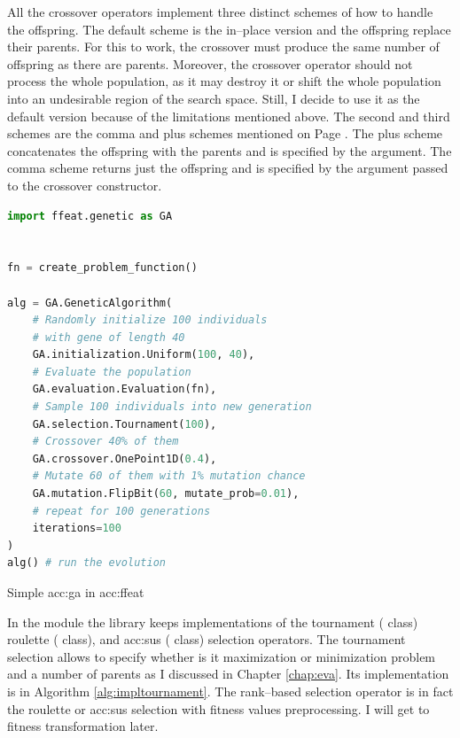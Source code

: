 All the crossover operators implement three distinct schemes of how to handle the offspring. The default scheme is the in--place version and the offspring replace their parents. For this to work, the crossover must produce the same number of offspring as there are parents. Moreover, the crossover operator should not process the whole population, as it may destroy it or shift the whole population into an undesirable region of the search space. Still, I decide to use it as the default version because of the \gpu limitations mentioned above.
The second and third schemes are the comma and plus schemes mentioned on Page \pageref{enum:steadystate}. The plus scheme concatenates the offspring with the parents and is specified by the  argument. The comma scheme returns just the offspring and is specified by the  argument passed to the crossover constructor.

\begin{algorithm}[b!]
\begin{lstlisting}[language=Python, xrightmargin=18pt]
import ffeat.genetic as GA


fn = create_problem_function()

alg = GA.GeneticAlgorithm(
    # Randomly initialize 100 individuals 
    # with gene of length 40
    GA.initialization.Uniform(100, 40),
    # Evaluate the population
    GA.evaluation.Evaluation(fn),
    # Sample 100 individuals into new generation
    GA.selection.Tournament(100),
    # Crossover 40% of them
    GA.crossover.OnePoint1D(0.4),
    # Mutate 60 of them with 1% mutation chance
    GA.mutation.FlipBit(60, mutate_prob=0.01),
    # repeat for 100 generations
    iterations=100
)
alg() # run the evolution
\end{lstlisting}
\caption{Simple \acrshort*{acc:ga} in \acrshort*{acc:ffeat}}
\label{alg:gaffeat}
\end{algorithm}

In the  module the library keeps implementations of the 
tournament ( class)
roulette ( class), 
and \acrlong{acc:sus} ( class)
selection operators. The tournament selection allows to specify whether is it maximization or minimization problem and a number of parents as I discussed in Chapter \ref{chap:eva}. Its implementation is in Algorithm \ref{alg:impltournament}. The rank--based selection operator is in fact the roulette or \acrshort{acc:sus} selection with fitness values preprocessing. I will get to fitness transformation later.

